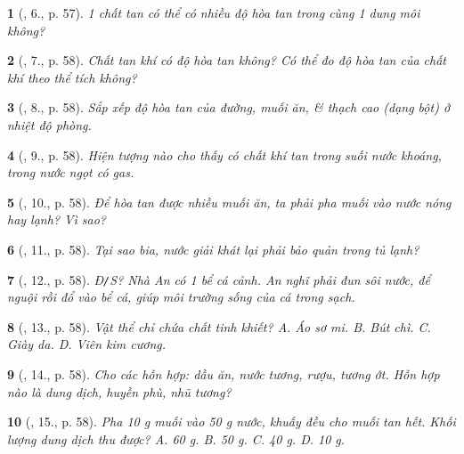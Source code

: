 \documentclass{article}
\newtheorem{baitoan}{}
\begin{document}
\begin{baitoan}[\cite{ncpt_KHTN_6_tap_1}, 6., p. 57]
	1 chất tan có thể có nhiều độ hòa tan trong cùng 1 dung môi không?
\end{baitoan}

\begin{baitoan}[\cite{ncpt_KHTN_6_tap_1}, 7., p. 58]
	Chất tan khí có độ hòa tan không? Có thể đo độ hòa tan của chất khí theo thể tích không?
\end{baitoan}

\begin{baitoan}[\cite{ncpt_KHTN_6_tap_1}, 8., p. 58]
	Sắp xếp độ hòa tan của đường, muối ăn, \& thạch cao (dạng bột) ở nhiệt độ phòng.
\end{baitoan}

\begin{baitoan}[\cite{ncpt_KHTN_6_tap_1}, 9., p. 58]
	Hiện tượng nào cho thấy có chất khí tan trong suối nước khoáng, trong nước ngọt có gas.
\end{baitoan}

\begin{baitoan}[\cite{ncpt_KHTN_6_tap_1}, 10., p. 58]
	Để hòa tan được nhiều muối ăn, ta phải pha muối vào nước nóng hay lạnh? Vì sao?
\end{baitoan}

\begin{baitoan}[\cite{ncpt_KHTN_6_tap_1}, 11., p. 58]
	Tại sao bia, nước giải khát lại phải bảo quản trong tủ lạnh?
\end{baitoan}

\begin{baitoan}[\cite{ncpt_KHTN_6_tap_1}, 12., p. 58]
	{\rm Đ{\tt/}S?} Nhà An có 1 bể cá cảnh. An nghĩ phải đun sôi nước, để nguội rồi đổ vào bể cá, giúp môi trường sống của cá trong sạch. 
\end{baitoan}

\begin{baitoan}[\cite{ncpt_KHTN_6_tap_1}, 13., p. 58]
	Vật thể chỉ chứa chất tinh khiết? {\sf A.} Áo sơ mi. {\sf B.} Bút chì. {\sf C.} Giày da. {\sf D.} Viên kim cương.
\end{baitoan}

\begin{baitoan}[\cite{ncpt_KHTN_6_tap_1}, 14., p. 58]
	Cho các hỗn hợp: dầu ăn, nước tương, rượu, tương ớt. Hỗn hợp nào là dung dịch, huyền phù, nhũ tương?
\end{baitoan}

\begin{baitoan}[\cite{ncpt_KHTN_6_tap_1}, 15., p. 58]
	Pha {\rm10 g} muối vào {\rm50 g} nước, khuấy đều cho muối tan hết. Khối lượng dung dịch thu được? {\sf A.} {\rm60 g}. {\sf B.} {\rm50 g}. {\sf C.} {\rm40 g}. {\sf D.} {\rm10 g}.
\end{baitoan}
\end{document}
